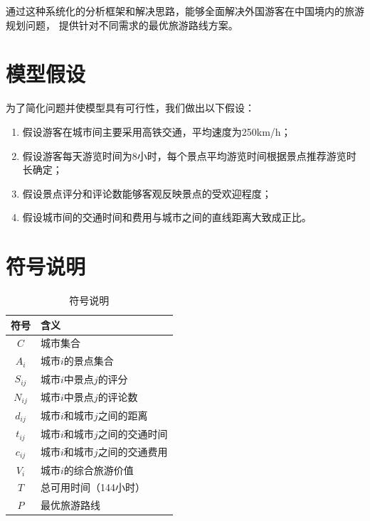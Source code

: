 \documentclass[withoutpreface,bwprint]{cumcmthesis} %
\begin{document}
通过这种系统化的分析框架和解决思路，能够全面解决外国游客在中国境内的旅游规划问题，
提供针对不同需求的最优旅游路线方案。






\section{模型假设}

为了简化问题并使模型具有可行性，我们做出以下假设：
\begin{enumerate}
    \item 假设游客在城市间主要采用高铁交通，平均速度为250km/h\cite{lan2017}；
    \item 假设游客每天游览时间为8小时，每个景点平均游览时间根据景点推荐游览时长确定；
    \item 假设景点评分和评论数能够客观反映景点的受欢迎程度\cite{li2021}\cite{kariam2022}；
    \item 假设城市间的交通时间和费用与城市之间的直线距离大致成正比\cite{profillidis2013}\cite{colson1914}。
\end{enumerate}


\section{符号说明}

\begin{table}[H]
    \centering
    \begin{tabular}{cl}
        \toprule
        符号 & 含义 \\
        \midrule
        $C$ & 城市集合 \\
        $A_i$ & 城市$i$的景点集合 \\
        $S_{ij}$ & 城市$i$中景点$j$的评分 \\
        $N_{ij}$ & 城市$i$中景点$j$的评论数 \\
        $d_{ij}$ & 城市$i$和城市$j$之间的距离 \\
        $t_{ij}$ & 城市$i$和城市$j$之间的交通时间 \\
        $c_{ij}$ & 城市$i$和城市$j$之间的交通费用 \\
        $V_i$ & 城市$i$的综合旅游价值 \\
        $T$ & 总可用时间（144小时） \\
        $P$ & 最优旅游路线 \\
        \bottomrule
    \end{tabular}

    \caption{符号说明}
    \label{tab:symbols}
\end{table}
\end{document}
